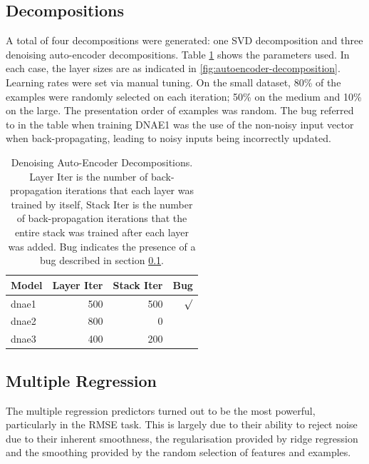 \documentclass{article}
\begin{document}
\subsection{Decompositions}
\label{sec:decompositions}

A total of four decompositions were generated: one SVD decomposition and three denoising auto-encoder decompositions.  Table \ref{table:dnae-decompositions} shows the parameters used.  In each case, the layer sizes are as indicated in \ref{fig:autoencoder-decomposition}.  Learning rates were set via manual tuning.  On the small dataset, 80\% of the examples were randomly selected on each iteration; 50\% on the medium and 10\% on the large.  The presentation order of examples was random.  The bug referred to in the table when training DNAE1 was the use of the non-noisy input vector when back-propagating, leading to noisy inputs being incorrectly updated.

\begin{table}
\caption{Denoising Auto-Encoder Decompositions.  Layer Iter is the number of back-propagation iterations that each layer was trained by itself, Stack Iter is the number of back-propagation iterations that the entire stack was trained after each layer was added.  Bug indicates the presence of a bug described in section \ref{sec:decompositions}.}
\label{table:dnae-decompositions}
\vskip 0.15in
\begin{center}
\begin{small}
\begin{sc}
\begin{tabular}{lrrr}
\hline
\abovespace\belowspace
Model & Layer Iter & Stack Iter & Bug \\
\hline
\abovespace
dnae1 & 500    & 500 & $\surd$ \\
dnae2 & 800    &   0 &         \\
\belowspace
dnae3 & 400    & 200 &         \\
\hline
\end{tabular}
\end{sc}
\end{small}
\end{center}
\vskip -0.1in
\end{table}


\subsection{Multiple Regression}

The multiple regression predictors turned out to be the most powerful, particularly in the RMSE task.  This is largely due to their ability to reject noise due to their inherent smoothness, the regularisation provided by ridge regression and the smoothing provided by the random selection of features and examples.
\end{document}
